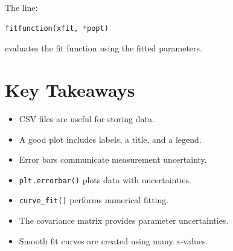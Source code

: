 \documentclass[11pt]{article}
\begin{document}
The line:

\begin{lstlisting}[language=Python]
fitfunction(xfit, *popt)
\end{lstlisting}

evaluates the fit function using the fitted parameters.

\section{Key Takeaways}

\begin{itemize}
    \item CSV files are useful for storing data.
    \item A good plot includes labels, a title, and a legend.
    \item Error bars communicate measurement uncertainty.
    \item \texttt{plt.errorbar()} plots data with uncertainties.
    \item \texttt{curve\_fit()} performs numerical fitting.
    \item The covariance matrix provides parameter uncertainties.
    \item Smooth fit curves are created using many x-values.
\end{itemize}
\end{document}

